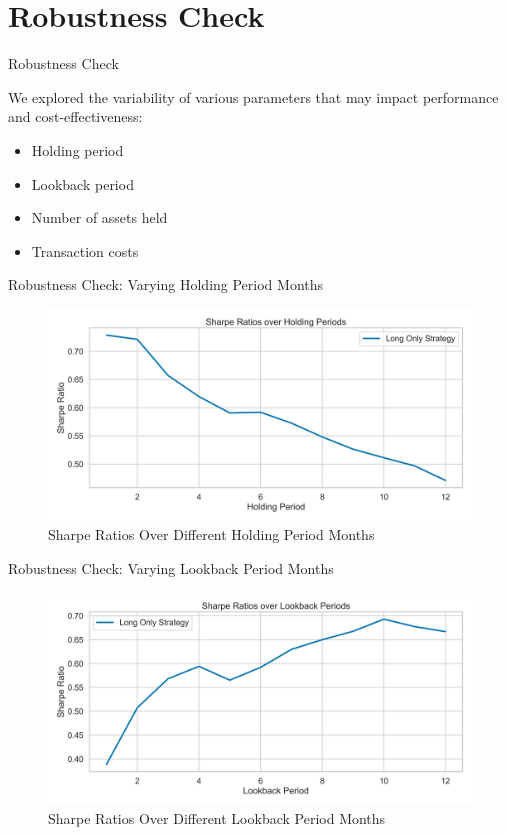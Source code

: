\documentclass[10pt]{beamer}
\begin{document}
\section{Robustness Check}
\begin{frame}{Robustness Check}

We explored the variability of various parameters that may impact performance and cost-effectiveness:

\begin{itemize}
    \item Holding period
    \item Lookback period
    \item Number of assets held
    \item Transaction costs    
\end{itemize}
\end{frame}

\begin{frame}{Robustness Check: Varying Holding Period Months}
  \begin{figure}
   \caption{Sharpe Ratios Over Different Holding Period Months}
        \centering
        \includegraphics[width=\linewidth]{figures/rc_holding_period.png}
    \end{figure}
\end{frame}

\begin{frame}{Robustness Check: Varying Lookback Period Months}
  \begin{figure}
   \caption{Sharpe Ratios Over Different Lookback Period Months}
        \centering
        \includegraphics[width=\linewidth]{figures/rc_lookback_period.png}
    \end{figure}
\end{frame}
\end{document}
